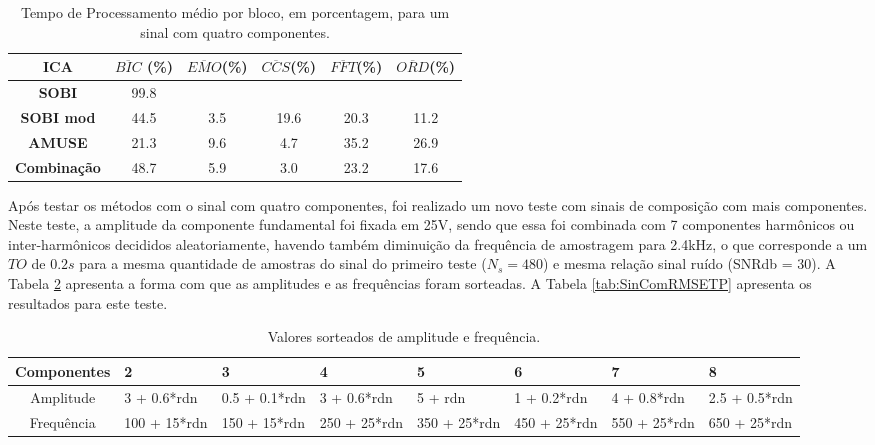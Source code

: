 \documentclass[a4paper,12pt]{monografia}
\theoremstyle{plain}
\theoremstyle{definition}
\theoremstyle{remark}
\begin{document}
\begin{table}[!htb]
    \begin{center}
        \caption{Tempo de Processamento médio por bloco, em porcentagem, para um sinal com quatro componentes.}
        \begin{tabular}{c|c c c c c}
        \hline
        \textbf{ICA}          & $\overline{BIC}$ (\%)  & $\overline{EMO}$(\%) & $\overline{CCS}$(\%)   & $\overline{FFT}$(\%)  & $\overline{ORD}$(\%)\\ \hline
        \textbf{SOBI}        & 99.8      & \ll 1     & \ll 1       & \ll 1      & \ll 1     \\ \hline
        \textbf{SOBI mod}     & 44.5        & 3.5     & 19.6        & 20.3       & 11.2     \\ \hline
        \textbf{AMUSE}        & 21.3        & 9.6      & 4.7       & 35.2       & 26.9     \\ \hline
        \textbf{Combinação}   & 48.7        & 5.9     & 3.0       & 23.2       & 17.6     \\ \hline
        \end{tabular}
        \label{tab:SinSimTPBlock}
    \end{center}
\end{table}

Após testar os métodos com o sinal com quatro componentes, foi realizado um novo teste com sinais de composição com mais componentes. Neste teste, a amplitude da componente fundamental foi fixada em 25V, sendo que essa foi combinada com 7 componentes harmônicos ou inter-harmônicos decididos aleatoriamente, havendo também diminuição da frequência de amostragem para 2.4kHz, o que corresponde a um $TO$ de $0.2s$ para a mesma quantidade de amostras do sinal do primeiro teste ($N_s=480$) e mesma relação sinal ruído (SNRdb = 30). A  Tabela \ref{tab:sorteioc} apresenta a forma com que as amplitudes e as frequências foram sorteadas. A Tabela \ref{tab:SinComRMSETP} apresenta os resultados para este teste.  

\begin{table}[h]
\advance\leftskip -1.5cm
    \begin{center}
    \caption{Valores sorteados de amplitude e frequência.}
        \begin{tabular}{c|m{1.5cm}|m{1.5cm}|m{1.5cm}|m{1.3cm}|m{1.5cm}|m{1.5cm}|m{1.5cm}}
        \hline
        Componentes &  2 & 3 & 4 & 5 & 6 & 7 & 8\\ \hline
        Amplitude   &  3 + 0.6*rdn & 0.5 + 0.1*rdn & 3 + 0.6*rdn & 5 + rdn & 1 + 0.2*rdn & 4 + 0.8*rdn & 2.5 + 0.5*rdn\\ \hline
        Frequência  & 100 + 15*rdn & 150 + 15*rdn & 250 + 25*rdn & 350 + 25*rdn & 450 + 25*rdn & 550 + 25*rdn & 650 + 25*rdn \\ \hline
        \end{tabular}
        \label{tab:sorteioc}
    \end{center}
\end{table}
\end{document}

